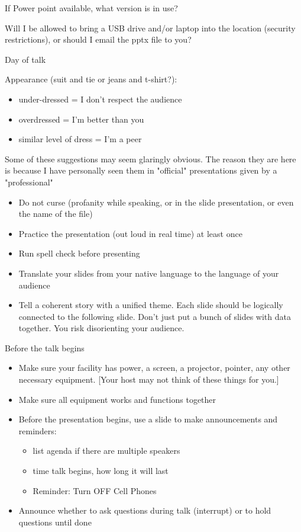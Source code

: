If Power point available, what version is in use?

Will I be allowed to bring a USB drive and/or laptop into the location (security restrictions), or should I email the pptx file to you?

Day of talk

Appearance (suit and tie or jeans and t-shirt?):
\begin{itemize}
    \item under-dressed = I don't respect the audience
    \item overdressed = I'm better than you
    \item similar level of dress = I'm a peer
\end{itemize}
Some of these suggestions may seem glaringly obvious. The reason they are here is because I have personally seen them in "official" presentations given by a "professional"
\begin{itemize}
    \item Do not curse (profanity while speaking, or in the slide presentation, or even the name of the file)
    \item Practice the presentation (out loud in real time) at least once
    \item Run spell check before presenting
    \item Translate your slides from your native language to the language of your audience
    \item Tell a coherent story with a unified theme. Each slide should be logically connected to the following slide. Don't just put a bunch of slides with data together. You risk disorienting your audience.
\end{itemize}
Before the talk begins
\begin{itemize}
    \item Make sure your facility has power, a screen, a projector, pointer, any other necessary equipment. [Your host may not think of these things for you.]
    \item Make sure all equipment works and functions together
    \item Before the presentation begins, use a slide to make announcements and reminders:
\begin{itemize}
    \item list agenda if there are multiple speakers
    \item time talk begins, how long it will last
    \item Reminder: Turn OFF Cell Phones
\end{itemize}
    \item Announce whether to ask questions during talk (interrupt) or to hold questions until done
\end{itemize}
